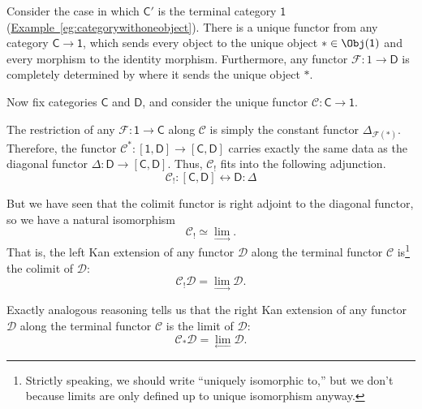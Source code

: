 \documentclass[notes.tex]{subfiles}
\begin{document}
\begin{example}
  \label{eg:kan_extensions_capture_limits_and_colimits}
  Consider the case in which $\mathsf{C}'$ is the terminal category $\mathsf{1}$ (\hyperref[eg:categorywithoneobject]{Example~\ref*{eg:categorywithoneobject}}). There is a unique functor from any category $\mathsf{C} \to \mathsf{1}$, which sends every object to the unique object $* \in \Obj(\mathsf{1})$ and every morphism to the identity morphism. Furthermore, any functor $\mathcal{F}\colon 1 \to \mathsf{D}$ is completely determined by where it sends the unique object $*$.

  Now fix categories $\mathsf{C}$ and $\mathsf{D}$, and consider the unique functor $\mathcal{C}\colon \mathsf{C} \to \mathsf{1}$.

  The restriction of any $\mathcal{F}\colon \mathsf{1} \to \mathsf{C}$ along $\mathcal{C}$ is simply the constant functor $\Delta_{\mathcal{F}(*)}$. Therefore, the functor $\mathcal{C}^{*}\colon [\mathsf{1},\mathsf{D}] \to [\mathsf{C}, \mathsf{D}]$ carries exactly the same data as the diagonal functor $\Delta\colon \mathsf{D} \to [\mathsf{C},\mathsf{D}]$. Thus, $\mathcal{C}_{!}$ fits into the following adjunction.
  \begin{equation*}
    \mathcal{C}_{!} : [\mathsf{C}, \mathsf{D}] \leftrightarrow \mathsf{D} : \Delta
  \end{equation*}

  But we have seen that the colimit functor is right adjoint to the diagonal functor, so we have a natural isomorphism
  \begin{equation*}
    \mathcal{C}_{!} \simeq \lim_{\rightarrow}.
  \end{equation*}
  That is, the left Kan extension of any functor $\mathcal{D}$ along the terminal functor $\mathcal{C}$ is\footnote{Strictly speaking, we should write ``uniquely isomorphic to,'' but we don't because limits are only defined up to unique isomorphism anyway.} the colimit of $\mathcal{D}$:
  \begin{equation*}
    \mathcal{C}_{!}\mathcal{D} = \lim_{\rightarrow} \mathcal{D}.
  \end{equation*}

  Exactly analogous reasoning tells us that the right Kan extension of any functor $\mathcal{D}$ along the terminal functor $\mathcal{C}$ is the limit of $\mathcal{D}$:
  \begin{equation*}
    \mathcal{C}_{*}\mathcal{D} = \lim_{\leftarrow} \mathcal{D}.
  \end{equation*}
\end{example}
\end{document}
